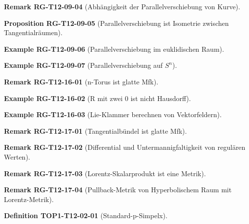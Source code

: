 \documentclass[10pt, letterpaper]{article}
\newcommand{\CustomHeading}[3]{%
  \par\medskip\noindent%
  \textbf{#1 #2} \textnormal{(#3)}.\enskip%
}
\newenvironment{DEF}[2]{\CustomHeading{Definition}{#1}{#2}}{}
\newenvironment{PROP}[2]{\CustomHeading{Proposition}{#1}{#2}}{}
\newenvironment{REM}[2]{\CustomHeading{Remark}{#1}{#2}}{}
\newenvironment{EXA}[2]{\CustomHeading{Example}{#1}{#2}}{}
\begin{document}
\begin{REM}{RG-T12-09-04}{Abhängigkeit der Parallelverschiebung von Kurve}
\end{REM}

\begin{PROP}{RG-T12-09-05}{Parallelverschiebung ist Isometrie zwischen Tangentialräumen}
\end{PROP}

\begin{EXA}{RG-T12-09-06}{Parallelverschiebung im euklidischen Raum}
\end{EXA}

\begin{EXA}{RG-T12-09-07}{Parallelverschiebung auf $S^n$}
\end{EXA}

\begin{REM}{RG-T12-16-01}{n-Torus ist glatte Mfk}
\end{REM}

\begin{EXA}{RG-T12-16-02}{R mit zwei $0$ ist nicht Hausdorff}
\end{EXA}

\begin{EXA}{RG-T12-16-03}{Lie-Klammer berechnen von Vektorfeldern}
\end{EXA}

\begin{REM}{RG-T12-17-01}{Tangentialbündel ist glatte Mfk}
\end{REM}

\begin{REM}{RG-T12-17-02}{Differential und Untermannigfaltigkeit von regulären Werten}
\end{REM}

\begin{REM}{RG-T12-17-03}{Lorentz-Skalarprodukt ist eine Metrik}
\end{REM}

\begin{REM}{RG-T12-17-04}{Pullback-Metrik von Hyperbolischem Raum mit Lorentz-Metrik}
\end{REM}

\begin{DEF}{TOP1-T12-02-01}{Standard-p-Simpelx}
\end{DEF}
\end{document}
